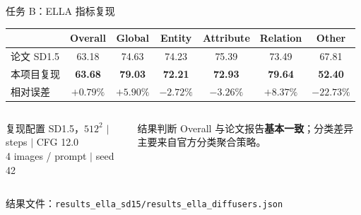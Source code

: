 \documentclass[aspectratio=169,10pt]{beamer}
\newcommand{\result}[1]{\textcolor{T2IBlue}{\bfseries #1}}
\newcommand{\diff}[1]{\textcolor{T2IRed}{\bfseries #1}}
\newcommand{\source}[1]{%
  \vfill\par\scriptsize\color{T2IGray}#1%
}
\begin{document}
\begin{frame}{任务 B：ELLA 指标复现}
  \begin{table}
    \centering\scriptsize
    \setlength{\tabcolsep}{8pt}
    \renewcommand{\arraystretch}{1.35}
    \begin{tabular}{lcccccc}
      \toprule
      & Overall & Global & Entity & Attribute & Relation & Other \\
      \midrule
      论文 SD1.5 & 63.18 & 74.63 & 74.23 & 75.39 & 73.49 & 67.81 \\
      本项目复现 & \result{63.68} & \result{79.03} & \result{72.21} & \result{72.93} & \result{79.64} & \result{52.40} \\
      相对误差 & \diff{$+0.79\%$} & \diff{$+5.90\%$} & \diff{$-2.72\%$} & \diff{$-3.26\%$} & \diff{$+8.37\%$} & \diff{$-22.73\%$} \\
      \bottomrule
    \end{tabular}
  \end{table}

  \vspace{1.0em}
  \begin{columns}[T,onlytextwidth]
      \begin{block}{复现配置}
        \centering\small
        SD1.5，$512^2$ \quad $|$  steps \quad $|$ \quad CFG 12.0\\[0.35em]
        4 images / prompt \quad $|$ \quad seed 42
      \end{block}
      \begin{block}{结果判断}
        \centering\small
        Overall 与论文报告\textbf{基本一致}；分类差异主要来自官方分类聚合策略。
      \end{block}
  \end{columns}
  \source{结果文件：\texttt{results\_ella\_sd15/results\_ella\_diffusers.json}}
\end{frame}

\end{document}
